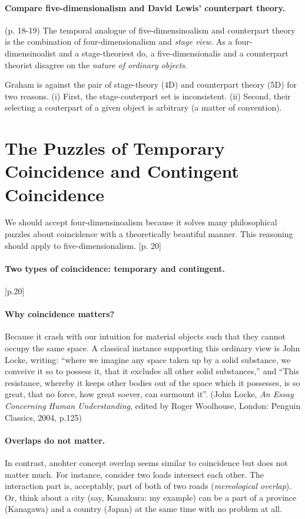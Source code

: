 \documentclass[
10pt, %
a4paper, %
twocolumn, %
landscape %
]{article}
\begin{document}
\paragraph{Compare five-dimensionalism and David Lewis' counterpart theory.}
(p. 18-19)
The temporal analogue of five-dimensinoalism and counterpart theory is the combination of four-dimensionalism and \emph{stage view}.
As a four-dimensinoalist and a stage-theoriest do, a five-dimensionalis and a counterpart theorist disagree on the \emph{nature of ordinary objects}.

Graham is against the pair of stage-theory (4D) and counterpart theory (5D) for two reasons.
(i) First, the stage-couterpart set is inconsistent. (ii) Second, their selecting a couterpart of a given object is arbitrary (a matter of convention).

\section{The Puzzles of Temporary Coincidence and Contingent Coincidence}
We should accept four-dimensinoalism because it solves many philosophical puzzles about coincidence with a theoretically beautiful manner. This reasoning should apply to five-dimensionalism. [p. 20]

\paragraph{Two types of coincidence: temporary and contingent.}
[p.20]

\paragraph{Why coincidence matters?}
Because it crash with our intuition for material objects such that they cannot occupy the same space.
A classical instance supporting this ordinary view is John Locke, writing:
``where we imagine any space taken up by a solid substance, we conveive it so to possess it, that it excludes all other solid substances,'' and
``This resistance, whereby it keeps other bodies out of the space which it possesses, is so great, that no force, how great soever, can surmount it''.
(John Locke, \textit{An Essay Concerning Human Understanding},  edited by Roger Woolhouse, London: Penguin Classics, 2004, p.125)

\paragraph{Overlaps do not matter.}
In contrast, anohter concept  {overlap} seems similar to coincidence but does not matter much. For instance, consider two loads intersect each other. The interaction part is, acceptably, part of both of two roads (\emph{mereological overlap}). Or, think about a city (say, Kamakura: my example) can be a part of a province (Kanagawa) and a country (Japan) at the same time with no problem at all.
\end{document}
